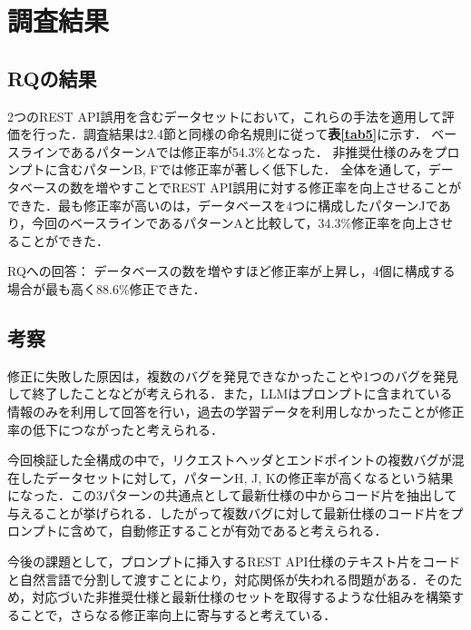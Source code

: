 \documentclass[uplatex,dvipdfmx,a4paper,twocolumn,base=12pt,jbase=12pt,ja=standard]{bxjsarticle}
\begin{document}
\section{調査結果}
\subsection{RQの結果}
2つのREST API誤用を含むデータセットにおいて，これらの手法を適用して評価を行った．調査結果は2.4節と同様の命名規則に従って\textbf{表\ref{tab5}}に示す．
ベースラインであるパターンAでは修正率が54.3\%となった．
非推奨仕様のみをプロンプトに含むパターンB, Fでは修正率が著しく低下した．
全体を通して，データベースの数を増やすことでREST API誤用に対する修正率を向上させることができた．最も修正率が高いのは，データベースを4つに構成したパターンJであり，今回のベースラインであるパターンAと比較して，34.3\%修正率を向上させることができた．






\begin{mdframed}[linewidth=1pt,linecolor=black]{RQへの回答：}
データベースの数を増やすほど修正率が上昇し，4個に構成する場合が最も高く88.6\%修正できた．
\end{mdframed}


\subsection{考察}

修正に失敗した原因は，複数のバグを発見できなかったことや1つのバグを発見して終了したことなどが考えられる．また，LLMはプロンプトに含まれている情報のみを利用して回答を行い，過去の学習データを利用しなかったことが修正率の低下につながったと考えられる．

今回検証した全構成の中で，リクエストヘッダとエンドポイントの複数バグが混在したデータセットに対して，パターンH, J, Kの修正率が高くなるという結果になった．この3パターンの共通点として最新仕様の中からコード片を抽出して与えることが挙げられる．したがって複数バグに対して最新仕様のコード片をプロンプトに含めて，自動修正することが有効であると考えられる．



今後の課題として，プロンプトに挿入するREST API仕様のテキスト片をコードと自然言語で分割して渡すことにより，対応関係が失われる問題がある．そのため，対応づいた非推奨仕様と最新仕様のセットを取得するような仕組みを構築することで，さらなる修正率向上に寄与すると考えている．




\end{document}
